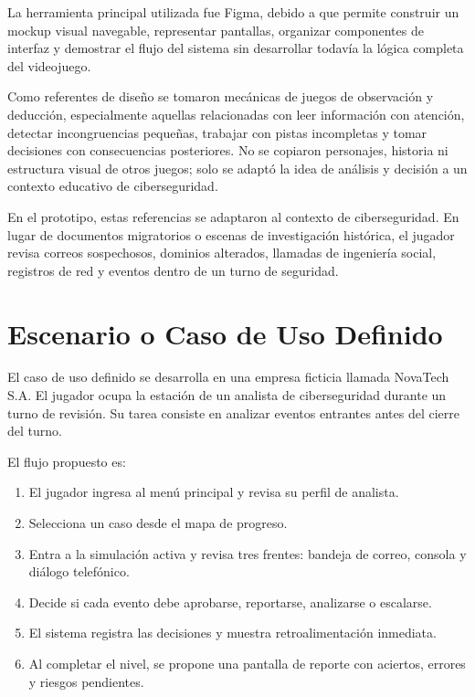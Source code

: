 ﻿\documentclass[12pt]{article}
\begin{document}
La herramienta principal utilizada fue Figma, debido a que permite construir un mockup visual navegable, representar pantallas, organizar componentes de interfaz y demostrar el flujo del sistema sin desarrollar todav\'{i}a la l\'{o}gica completa del videojuego.

Como referentes de dise\~{n}o se tomaron mec\'{a}nicas de juegos de observaci\'{o}n y deducci\'{o}n, especialmente aquellas relacionadas con leer informaci\'{o}n con atenci\'{o}n, detectar incongruencias peque\~{n}as, trabajar con pistas incompletas y tomar decisiones con consecuencias posteriores. No se copiaron personajes, historia ni estructura visual de otros juegos; solo se adapt\'{o} la idea de an\'{a}lisis y decisi\'{o}n a un contexto educativo de ciberseguridad.

En el prototipo, estas referencias se adaptaron al contexto de ciberseguridad. En lugar de documentos migratorios o escenas de investigaci\'{o}n hist\'{o}rica, el jugador revisa correos sospechosos, dominios alterados, llamadas de ingenier\'{i}a social, registros de red y eventos dentro de un turno de seguridad.

\section{Escenario o Caso de Uso Definido}

El caso de uso definido se desarrolla en una empresa ficticia llamada NovaTech S.A. El jugador ocupa la estaci\'{o}n de un analista de ciberseguridad durante un turno de revisi\'{o}n. Su tarea consiste en analizar eventos entrantes antes del cierre del turno.

El flujo propuesto es:

\begin{enumerate}
    \item El jugador ingresa al men\'{u} principal y revisa su perfil de analista.
    \item Selecciona un caso desde el mapa de progreso.
    \item Entra a la simulaci\'{o}n activa y revisa tres frentes: bandeja de correo, consola y di\'{a}logo telef\'{o}nico.
    \item Decide si cada evento debe aprobarse, reportarse, analizarse o escalarse.
    \item El sistema registra las decisiones y muestra retroalimentaci\'{o}n inmediata.
    \item Al completar el nivel, se propone una pantalla de reporte con aciertos, errores y riesgos pendientes.
\end{enumerate}
\end{document}
